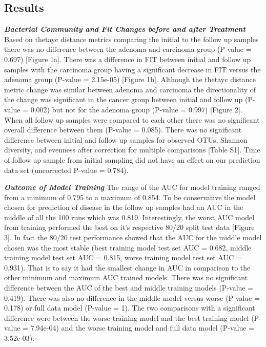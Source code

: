 \documentclass[12pt,]{article}
\begin{document}
\newpage

\subsection{Results}\label{results}

\textbf{\emph{Bacterial Community and Fit Changes before and after
Treatment}} Based on thetayc distance metrics comparing the initial to
the follow up samples there was no difference between the adenoma and
carcinoma group (P-value = 0.697) {[}Figure 1a{]}. There was a
difference in FIT between initial and follow up samples with the
carcinoma group having a significant decrease in FIT versus the adenoma
group (P-value = 2.15e-05) {[}Figure 1b{]}. Although the thetayc
distance metric change was similar between adenoma and carcinoma the
directionality of the change was significant in the cancer group between
initial and follow up (P-value = 0.002) but not for the adenoma group
(P-value = 0.997) {[}Figure 2{]}. When all follow up samples were
compared to each other there was no significant overall difference
between them (P-value = 0.085). There was no significant difference
between initial and follow up samples for observed OTUs, Shannon
diversity, and evenness after correction for multiple comparisons
{[}Table S1{]}. Time of follow up sample from initial sampling did not
have an effect on our prediction data set (uncorrected P-value = 0.784).

\textbf{\emph{Outcome of Model Training}} The range of the AUC for model
training ranged from a minimum of 0.795 to a maximum of 0.854. To be
conservative the model chosen for prediction of disease in the follow up
samples had an AUC in the middle of all the 100 runs which was 0.819.
Interestingly, the worst AUC model from training performed the best on
it's respective 80/20 split test data {[}Figure 3{]}. In fact the 80/20
test performance showed that the AUC for the middle model chosen was the
most stable (best training model test set AUC = 0.682, middle training
model test set AUC = 0.815, worse training model test set AUC = 0.931).
That is to say it had the smallest change in AUC in comparison to the
other minimum and maximum AUC trained models. There was no significant
difference between the AUC of the best and middle training models
(P-value = 0.419). There was also no difference in the middle model
versus worse (P-value = 0.178) or full data model (P-value = 1). The two
comparisons with a significant difference were between the worse
training model and the best training model (P-value = 7.94e-04) and the
worse training model and full data model (P-value = 3.52e-03).
\end{document}
